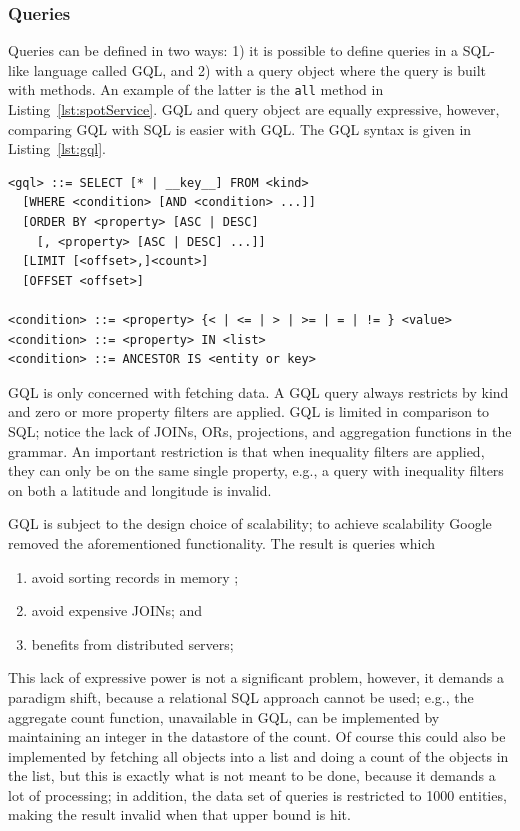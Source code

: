 \subsubsection{Queries}
\label{sec:queries}
Queries can be defined in two ways: 1) it is possible to define queries in a
SQL-like language called GQL, and 2) with a query object where the query is built
with methods. An example of the latter is the \verb|all| method in
Listing~\ref{lst:spotService}. GQL and query object are equally expressive,
however, comparing GQL with SQL is easier with GQL. The GQL syntax is given in
Listing~\ref{lst:gql}.  \lstset{language=SQL}
\begin{lstlisting}[caption=GQL grammar,label=lst:gql]
<gql> ::= SELECT [* | __key__] FROM <kind>
  [WHERE <condition> [AND <condition> ...]]
  [ORDER BY <property> [ASC | DESC] 
    [, <property> [ASC | DESC] ...]]
  [LIMIT [<offset>,]<count>]
  [OFFSET <offset>]

<condition> ::= <property> {< | <= | > | >= | = | != } <value>
<condition> ::= <property> IN <list>
<condition> ::= ANCESTOR IS <entity or key>
\end{lstlisting}
GQL is only concerned with fetching data. A GQL query always restricts by kind
 and zero or more property filters are applied. GQL is limited in comparison to
 SQL; notice the lack of JOINs, ORs, projections, and aggregation functions in
 the grammar. An important restriction is that when inequality filters are
 applied, they can only be on the same single property, e.g., a query with
 inequality filters on both a latitude and longitude is invalid.

GQL is subject to the design choice of scalability; to achieve scalability
Google removed the aforementioned functionality. The result is queries which %
\begin{enumerate}
  \item avoid sorting records in memory \citep{Google:iodatastore}; 
  \item avoid expensive JOINs; and
  \item benefits from distributed servers; 
\end{enumerate}
%
This lack of expressive power is not a significant problem, however, it demands a
paradigm shift, because a relational SQL approach cannot be used; e.g., the
aggregate count function, unavailable in GQL, can be implemented by maintaining
an integer in the datastore of the count. Of course this could also be
implemented by fetching all objects into a list and doing a count of the objects
in the list, but this is exactly what is not meant to be done, because it demands
a lot of processing; in addition, the data set of queries is restricted to 1000
entities, making the result invalid when that upper bound is hit.

